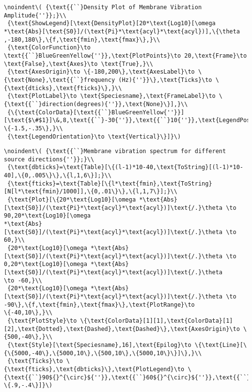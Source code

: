 \begin{appendix}
\begin{verbatim}
\noindent\( {\text{{``}Density Plot of Membrane Vibration Amplitude{''}};}\\
 {\text{ShowLegend}[\text{DensityPlot}[20*\text{Log10}[\omega *\text{Abs}[\text{S0}]/(\text{Pi}*\text{acyl}*\text{acyl})],\{\theta ,-180,180\},\{f,\text{fmin},\text{fmax}\},}\\
 {\text{ColorFunction}\to \text{{``}BlueGreenYellow{''}},\text{PlotPoints}\to 20,\text{Frame}\to \text{False},\text{Axes}\to \text{True},}\\
 {\text{AxesOrigin}\to \{-180,200\},\text{AxesLabel}\to \{\text{None},\text{{``}frequency (Hz){''}}\},\text{Ticks}\to \{\text{dticks},\text{fticks}\},}\\
 {\text{PlotLabel}\to \text{Speciesname},\text{FrameLabel}\to \{\text{{``}direction(degrees){''}},\text{None}\}],}\\
 {\{\text{ColorData}[\text{{``}BlueGreenYellow{''}}][\text{$\#$1}]\&,8,\text{{``}-30{''}},\text{{``}10{''}},\text{LegendPosition}\to \{-1.5,-.35\},}\\
 {\text{LegendOrientation}\to \text{Vertical}\}]}\)
\end{verbatim}

\begin{verbatim}
\noindent\( {\text{{``}Membrane vibration spectrum for different source directions{''}};}\\
 {\text{dbticks}=\text{Table}[\{(l-1)*10-40,\text{ToString}[(l-1)*10-40],\{0,.005\}\},\{l,1,6\}];}\\
 {\text{fticks}=\text{Table}[\{l*\text{fmin},\text{ToString}[N[l*\text{fmin}/1000]],\{0,.01\}\},\{l,1,7\}];}\\
 {\text{Plot}[\{20*\text{Log10}[\omega *\text{Abs}[\text{S0}]/(\text{Pi}*\text{acyl}*\text{acyl})]\text{/.}\theta \to 90,20*\text{Log10}[\omega
*\text{Abs}[\text{S0}]/(\text{Pi}*\text{acyl}*\text{acyl})]\text{/.}\theta \to 60,}\\
 {20*\text{Log10}[\omega *\text{Abs}[\text{S0}]/(\text{Pi}*\text{acyl}*\text{acyl})]\text{/.}\theta \to 0,20*\text{Log10}[\omega *\text{Abs}[\text{S0}]/(\text{Pi}*\text{acyl}*\text{acyl})]\text{/.}\theta
\to -60,}\\
 {20*\text{Log10}[\omega *\text{Abs}[\text{S0}]/(\text{Pi}*\text{acyl}*\text{acyl})]\text{/.}\theta \to -90\},\{f,\text{fmin},\text{fmax}\},\text{PlotRange}\to
\{-40,10\},}\\
 {\text{PlotStyle}\to \{\text{ColorData}[1][1],\text{ColorData}[1][2],\text{Dotted},\text{Dashed},\text{Dashed}\},\text{AxesOrigin}\to \{500,-40\},}\\
 {\text{Style}[\text{Speciesname},16],\text{Epilog}\to \{\text{Line}[\{\{5000,-40\},\{5000,10\},\{500,10\},\{5000,10\}\}]\},}\\
 {\text{Ticks}\to \{\text{fticks},\text{dbticks}\},\text{PlotLegend}\to \{\text{{``}90${}^{\circ}${''}},\text{{``}60${}^{\circ}${''}},\text{{``}0${}^{\circ}${''}},\text{{``}-60${}^{\circ}${''}},\text{{``}-90${}^{\circ}${''}}\},\text{LegendPosition}\to
\{.9,-.4\}]}\)
\end{verbatim}


\end{appendix}
